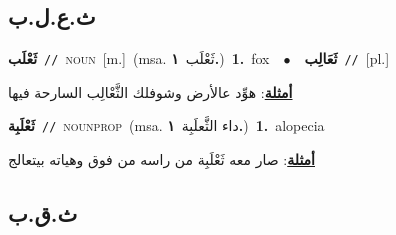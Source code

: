 \documentclass[10pt,a4paper,twoside]{article} %
\begin{document}
\begin{multicols}{2}
{{{{{\vspace{-3mm}
\subsection*{\color{blue}\foreignlanguage{arabic}{ث.ع.ل.ب}\color{blue}{}} 

{\setlength\topsep{0pt}\textbf{\foreignlanguage{arabic}{ثَعْلَب}}\ {\color{gray}\texttt{//}\color{black}}\ \textsc{noun}\ [m.]\ \color{gray}(msa. \foreignlanguage{arabic}{ثَعْلَب}~\foreignlanguage{arabic}{\textbf{١.}})\color{black}\ \textbf{1.}~fox\ \ $\bullet$\ \ \setlength\topsep{0pt}\textbf{\foreignlanguage{arabic}{ثَعَالِب}}\ {\color{gray}\texttt{//}\color{black}}\ [pl.]\  \begin{flushright}\color{gray}\foreignlanguage{arabic}{\textbf{\underline{\foreignlanguage{arabic}{أمثلة}}}: هوِّد عالأرض وشوفلك الثَّعْالِب السارحة فيها}\end{flushright}\color{black}} \vspace{2mm}

{\setlength\topsep{0pt}\textbf{\foreignlanguage{arabic}{ثَعْلَبِة}}\ {\color{gray}\texttt{//}\color{black}}\ \textsc{noun\textunderscore prop}\ \color{gray}(msa. \foreignlanguage{arabic}{داء الثَّعلَبِة}~\foreignlanguage{arabic}{\textbf{١.}})\color{black}\ \textbf{1.}~alopecia\  \begin{flushright}\color{gray}\foreignlanguage{arabic}{\textbf{\underline{\foreignlanguage{arabic}{أمثلة}}}: صار معه ثَعْلَبِة من راسه من فوق وهياته بيتعالج}\end{flushright}\color{black}} \vspace{2mm}

\vspace{-3mm}
\subsection*{\color{blue}\foreignlanguage{arabic}{ث.ق.ب}\color{blue}{}} 

}}}}}
\end{multicols}
\end{document}
